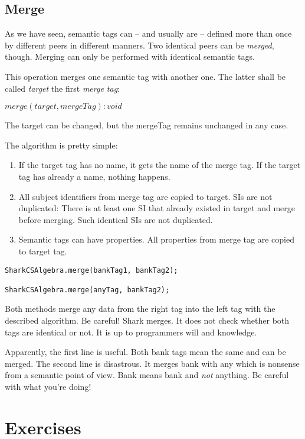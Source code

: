 \subsection{Merge}
As we have seen, semantic tags can -- and usually are -- defined more than once by different peers in different manners. Two identical peers can be {\it merged}, though. Merging can only be performed with identical semantic tags.

This operation merges one semantic tag with another one. The latter shall be called {\it target} the first {\it merge tag}:

$merge(target, mergeTag): void$

The target can be changed, but the mergeTag remains unchanged in any case.

The algorithm is pretty simple:

\begin{enumerate}
\item
If the target tag has no name, it gets the name of the merge tag. If the target tag has already a name, nothing happens.

\item
All subject identifiers from merge tag are copied to target. SIs are not duplicated: There is at least one SI that already existed in target and merge before merging. Such identical SIs are not duplicated.

\item
Semantic tags can have properties. All properties from merge tag are copied to target tag.
\end{enumerate}

\begin{verbatim}
SharkCSAlgebra.merge(bankTag1, bankTag2);

SharkCSAlgebra.merge(anyTag, bankTag2);
\end{verbatim}

Both methods merge any data from the right tag into the left tag with the described algorithm. Be careful! Shark merges. It does not check whether both tags are identical or not. It is up to programmers will and knowledge.

Apparently, the first line is useful. Both bank tags mean the same and can be merged. The second line is disastrous. It merges bank with any which is nonsense from a semantic point of view. Bank means bank and {\it not} anything. Be careful with what you're doing!

\section{Exercises}

